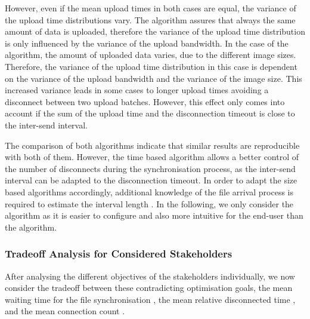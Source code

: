 However, even if the mean upload times in both cases are equal, the variance of the upload time distributions vary.
The \algosize algorithm assures that always the same amount of data is uploaded, therefore the variance of the upload time distribution is only influenced by the variance of the upload bandwidth.
In the case of the \algointerval algorithm, the amount of uploaded data varies, due to the different image sizes.
Therefore, the variance of the upload time distribution in this case is dependent on the variance of the upload bandwidth and the variance of the image size.
This increased variance leads in some cases to longer upload times avoiding a disconnect between two upload batches.
However, this effect only comes into account if the sum of the upload time and the disconnection timeout is close to the inter-send interval.

The comparison of both algorithms indicate that similar results are reproducible with both of them.
However, the time based algorithm allows a better control of the number of disconnects during the synchronisation process, as the inter-send interval can be adapted to the disconnection timeout.
In order to adapt the size based algorithms accordingly, additional knowledge of the file arrival process is required to estimate the interval length \thresholdInterval.
In the following, we only consider the \algointerval algorithm as it is easier to configure and also more intuitive for the end-user than the \algosize algorithm.

\subsubsection*{Tradeoff Analysis for Considered Stakeholders}\label{sec:application:cloud_file_synchronisation:numerical_evaluation:trade_off_analysis}

After analysing the different objectives of the stakeholders individually, we now consider the tradeoff between these contradicting optimisation goals, the mean waiting time for the file synchronisation \sojournTime, the mean relative disconnected time \relativeDisconnectedTime, and the mean connection count \connectionCount.

